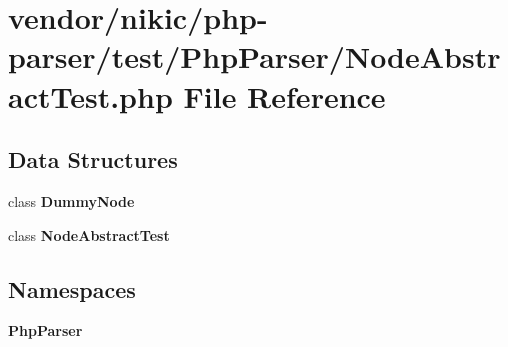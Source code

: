 \section{vendor/nikic/php-\/parser/test/\+Php\+Parser/\+Node\+Abstract\+Test.php File Reference}
\label{_node_abstract_test_8php}
\subsection*{Data Structures}
\begin{DoxyCompactItemize}
\item 
class {\bf Dummy\+Node}
\item 
class {\bf Node\+Abstract\+Test}
\end{DoxyCompactItemize}
\subsection*{Namespaces}
\begin{DoxyCompactItemize}
\item 
 {\bf Php\+Parser}
\end{DoxyCompactItemize}
